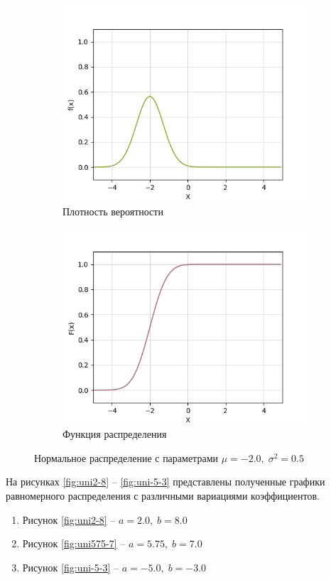 \begin{figure}[H]
	\begin{subfigure}{.5\textwidth}
		\centering
		\includegraphics[width=.8\linewidth]{assets/normpdf-2-05.png}
		\caption{Плотность вероятности}
		\label{fig:normpdf-2-05}
	\end{subfigure}%
	\begin{subfigure}{.5\textwidth}
		\centering
		\includegraphics[width=.8\linewidth]{assets/normcdf-2-05.png}
		\caption{Функция распределения}
		\label{fig:normcdf-2-05}
	\end{subfigure}
	\caption{Нормальное распределение с параметрами $\mu = -2.0, \; \sigma^2 = 0.5$}
	\label{fig:norm-2-05}
\end{figure}

На рисунках \ref{fig:uni2-8} -- \ref{fig:uni-5-3} представлены полученные графики равномерного распределения с различными вариациями коэффициентов.
\begin{enumerate}
	\item Рисунок \ref{fig:uni2-8} -- $a = 2.0, \; b = 8.0$
	\item Рисунок \ref{fig:uni575-7} -- $a = 5.75, \; b = 7.0$
	\item Рисунок \ref{fig:uni-5-3} -- $a = -5.0, \; b = -3.0$
\end{enumerate}

